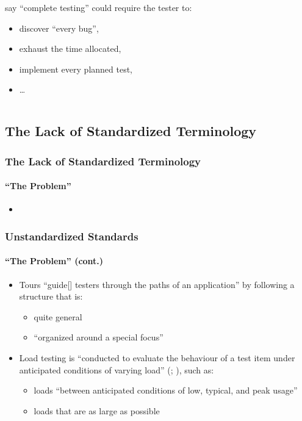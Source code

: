 \documentclass{beamer}
\newcommand{\citepISTQB}{\citepalias[\citeyear{ISTQB}]{ISTQB}}
\begin{document}
\begin{frame}
\begin{columns}[T]
\begin{column}
            \citet[p.~7]{KanerEtAl2011} say ``complete testing'' could require
            the tester to:
            \begin{itemize}
                \item discover ``every bug'',
                \item exhaust the time allocated,
                \item implement every planned test,
                \item \dots{}
            \end{itemize}
        \end{column}
    \end{columns}
\end{frame}

\subsection{The Lack of Standardized Terminology}

\begin{frame}
    \frametitle{The Lack of Standardized Terminology}
    \framesubtitle{``The Problem''}
    \begin{itemize}
        \item \badTaxonomies{}
    \end{itemize}
\end{frame}

\begin{frame}
    \frametitle{Unstandardized Standards}
    \framesubtitle{``The Problem'' (cont.)}
    \begin{itemize}
        \item Tours ``guide[] testers through the paths of an application'' by
              following a structure that is:
              \begin{itemize}
                  \item quite general \citep[p.~34]{IEEE2022}
                  \item<2-> ``organized around a special focus'' \citepISTQB{}
              \end{itemize}
        \item<3-> Load testing is ``conducted to evaluate the behaviour of a
              test item under anticipated conditions of varying load''
              (\citealp[p.~5]{IEEE2022}; \citeyear[p.~253]{IEEE2017}), such as:
              \begin{itemize}
                  \item<3-> loads ``between anticipated conditions of low,
                        typical, and peak usage'' \citeyearpar[p.~5]{IEEE2022}
                  \item<4-> loads that are as large as possible
                        \citep[p.~86]{Patton2006}
              \end{itemize}
    \end{itemize}
\end{frame}
\end{document}
